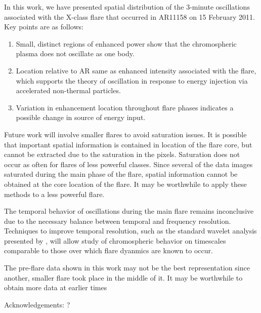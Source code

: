
In this work, we have presented spatial distribution of the 3-minute oscillations
associated with the X-class flare that occurred in AR11158 on 15 February 2011.
Key points are as follows:
\begin{enumerate}
    \item Small, distinct regions of enhanced power show that
        the chromospheric plasma does not oscillate as one body.
    \item Location relative to AR same as enhanced intensity associated
        with the flare, which supports the theory of oscillation in response
        to energy injection via accelerated non-thermal particles.
    \item Variation in enhancement location throughout flare phases
        indicates a possible change in source of energy input.
\end{enumerate}




Future work will involve smaller flares to avoid saturation issues.
It is possible that important spatial information is contained
in location of the flare core,
but cannot be extracted due to the saturation in the pixels.
Saturation does not occur as often for flares
of less powerful classes.
Since several of the data images saturated during the main phase of the flare,
spatial information cannot be obtained at the core location of the flare.
It may be worthwhile to apply these methods to a less powerful flare.

The temporal behavior of oscillations during the main flare remains
inconclusive due to the necessary balance between temporal and frequency
resolution.
Techniques to improve temporal resolution,
such as the standard wavelet analysis
presented by \cite{Torrence1998},
will allow study of chromospheric behavior on timescales comparable to those
over which flare dyanmics are known to occur.

The pre-flare data shown in this work may not be the best representation
since another, smaller flare took place in the middle of it.
It may be worthwhile to obtain more data at earlier times

Acknowledgements: ?
